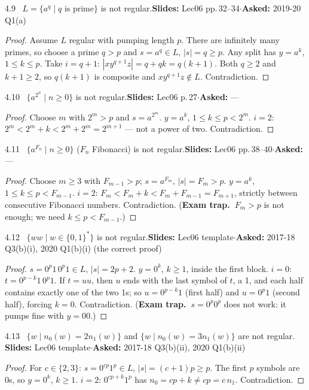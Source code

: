 \documentclass[10.5pt,a4paper]{article}
\newcommand{\TRAP}{\textbf{\color{trapborder}Exam trap.\ }}
\newcommand{\src}[2]{{\footnotesize\color{gray!70!black}\textbf{Slides:} #1\enspace$\cdot$\enspace\textbf{Asked:} #2}\par}
\begin{document}
\begin{thm}{4.9 \ $L=\{a^q\mid q \text{ is prime}\}$ is not regular.}\src{Lec06 pp.\,32--34}{2019-20 Q1(a)}\end{thm}
\begin{proof}
Assume $L$ regular with pumping length $p$. There are infinitely many primes, so choose a prime $q>p$ and $s=a^q\in L$, $|s|=q\ge p$. Any
split has $y=a^k$, $1\le k\le p$. Take $i=q+1$: $|xy^{q+1}z|=q+qk=q(k+1)$. Both $q\ge2$ and $k+1\ge2$, so $q(k+1)$ is composite and
$xy^{q+1}z\notin L$. Contradiction.
\end{proof}

\begin{thm}{4.10 \ $\{a^{2^n}\mid n\ge0\}$ is not regular.}\src{Lec06 p.\,27}{---}\end{thm}
\begin{proof}
Choose $m$ with $2^m>p$ and $s=a^{2^m}$. $y=a^k$, $1\le k\le p<2^m$. $i=2$: $2^m<2^m+k<2^m+2^m=2^{m+1}$ --- not a power of two. Contradiction.
\end{proof}

\begin{thm}{4.11 \ $\{a^{F_n}\mid n\ge0\}$ ($F_n$ Fibonacci) is not regular.}\src{Lec06 pp.\,38--40}{---}\end{thm}
\begin{proof}
Choose $m\ge3$ with $F_{m-1}>p$; $s=a^{F_m}$, $|s|=F_m>p$. $y=a^k$, $1\le k\le p<F_{m-1}$. $i=2$: $F_m<F_m+k<F_m+F_{m-1}=F_{m+1}$,
strictly between consecutive Fibonacci numbers. Contradiction. (\TRAP $F_m>p$ is not enough; we need $k\le p<F_{m-1}$.)
\end{proof}

\begin{thm}{4.12 \ $\{ww\mid w\in\{0,1\}^*\}$ is not regular.}\src{Lec06 template}{2017-18 Q3(b)(i), 2020 Q1(b)(i) (the correct proof)}\end{thm}
\begin{proof}
$s=0^p1\,0^p1\in L$, $|s|=2p+2$. $y=0^k$, $k\ge1$, inside the first block. $i=0$: $t=0^{p-k}1\,0^p1$. If $t=uu$, then $u$ ends with the last
symbol of $t$, a 1, and each half contains exactly one of the two 1s; so $u=0^{p-k}1$ (first half) and $u=0^p1$ (second half), forcing
$k=0$. Contradiction. (\TRAP $s=0^p0^p$ does not work: it pumps fine with $y=00$.)
\end{proof}

\begin{thm}{4.13 \ $\{w\mid n_0(w)=2n_1(w)\}$ and $\{w\mid n_0(w)=3n_1(w)\}$ are not regular.}
\src{Lec06 template}{2017-18 Q3(b)(ii), 2020 Q1(b)(ii)}\end{thm}
\begin{proof}
For $c\in\{2,3\}$: $s=0^{cp}1^p\in L$, $|s|=(c+1)p\ge p$. The first $p$ symbols are 0s, so $y=0^k$, $k\ge1$. $i=2$: $0^{cp+k}1^p$ has
$n_0=cp+k\ne cp=c\,n_1$. Contradiction.
\end{proof}
\end{document}
